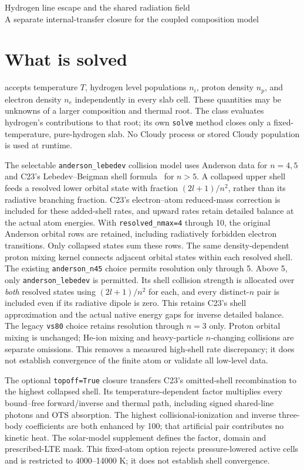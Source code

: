 \documentclass[10pt,a4paper]{article}
\begin{document}
\begin{center}
{\Large Hydrogen line escape and the shared radiation field}\\[4pt]
A separate internal-transfer closure for the coupled composition model
\end{center}

\section{What is solved}
accepts temperature $T$, hydrogen level populations $n_i$, proton density
$n_p$, and electron density $n_e$ independently in every slab cell. These
quantities may be unknowns of a larger composition and thermal root.
The class evaluates hydrogen's contributions to that root; its own
\texttt{solve} method closes only a fixed-temperature, pure-hydrogen slab.
No Cloudy process or stored Cloudy population is used at runtime.

The selectable \texttt{anderson\_lebedev} collision model uses Anderson
data for $n=4,5$ and C23's Lebedev--Beigman shell formula~\cite{lebedev} for
$n>5$. A collapsed upper shell feeds a resolved lower orbital state with
fraction $(2l+1)/n^2$, rather than its radiative branching fraction. C23's
electron--atom reduced-mass correction is included for these added-shell
rates, and upward rates retain detailed balance at the actual atom energies.
With \texttt{resolved\_nmax=4} through 10, the original Anderson orbital rows
are retained, including radiatively forbidden electron transitions.
Only collapsed states sum these rows. The same density-dependent proton
mixing kernel connects adjacent orbital states within each resolved shell.
The existing \texttt{anderson\_n45} choice permits resolution only through 5.
Above 5, only
\texttt{anderson\_lebedev} is permitted. Its shell collision strength is
allocated over \emph{both} resolved states using $(2l+1)/n^2$ for each,
and every distinct-$n$ pair is included even if its radiative dipole is zero.
This retains C23's shell approximation and the actual native energy gaps
for inverse detailed balance. The legacy \texttt{vs80} choice retains
resolution through $n=3$ only. Proton orbital mixing is unchanged;
He-ion mixing and heavy-particle $n$-changing collisions are separate omissions.
This removes a measured high-shell rate discrepancy; it does not establish
convergence of the finite atom or validate all low-level data.

The optional \texttt{topoff=True} closure transfers C23's omitted-shell
recombination to the highest collapsed shell. Its temperature-dependent
factor multiplies every bound--free forward/inverse and thermal path,
including signed shared-line photons and OTS absorption. The highest
collisional-ionization and inverse three-body coefficients are both
enhanced by 100; that artificial pair contributes no kinetic heat.
The solar-model supplement defines the factor, domain and prescribed-LTE
mask. This fixed-atom option rejects pressure-lowered active cells and is
restricted to 4000--14000 K; it does not establish shell convergence.
\end{document}
